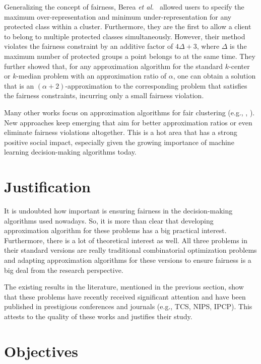 \documentclass[12pt]{article}
\begin{document}
Generalizing the concept of fairness, Berea \emph{et al.}~\cite{BCFN2019} allowed users to specify the maximum over-representation and minimum under-representation for any protected class within a cluster.
Furthermore, they are the first to allow a client to belong to multiple protected classes simultaneously.
However, their method violates the fairness constraint by an additive factor of $4\Delta +3$, where $\Delta$ is the maximum number of protected groups a point belongs to at the same time.
They further showed that, for any approximation algorithm for the standard $k$-center or $k$-median problem with an approximation ratio of $\alpha$, one can obtain a solution that is an $(\alpha + 2)$-approximation to the corresponding problem that satisfies the fairness constraints, incurring only a small fairness violation.

Many other works focus on approximation algorithms for fair clustering (e.g., \cite{WFW2024}, \cite{JSS2020}). New approaches keep emerging that aim for better approximation ratios or even eliminate fairness violations altogether. This is a hot area that has a strong positive social impact, especially given the growing importance of machine learning decision-making algorithms today.

\section{Justification}
It is undoubted how important is ensuring fairness in the decision-making algorithms used nowadays. 
So, it is more than clear that developing approximation algorithm for these problems has a big practical interest. 
Furthermore, there is a lot of theoretical interest as well.
All three problems in their standard versions are really traditional combinatorial optimization problems and adapting approximation algorithms for these versions to ensure fairness is a big deal from the research perspective.

The existing results in the literature, mentioned in the previous section, show that these problems have recently received significant attention and have been published in prestigious conferences and journals (e.g., TCS, NIPS, IPCP). This attests to the quality of these works and justifies their study.

\section{Objectives}
\end{document}
